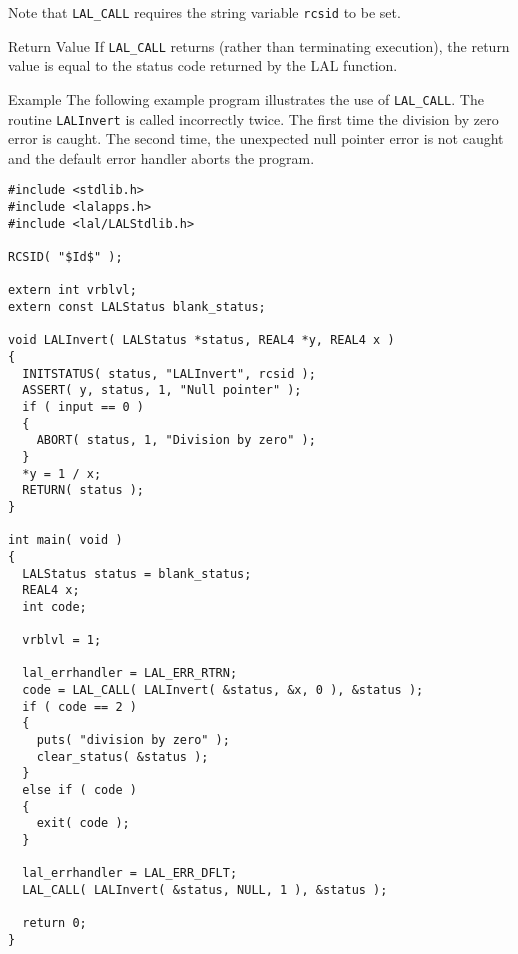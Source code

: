 \documentclass[oneside]{book}
\newenvironment{entry}%
  {\begin{list}{}{\renewcommand{\makelabel}[1]%
    {\parbox[b]{\labelwidth}{\makebox[0pt][l]{\textbf{##1}}\\}}%
    \setlength{\labelwidth}{1em}%
    \setlength{\labelsep}{1em}%
    \setlength{\leftmargin}{2em}%
    \setlength{\topsep}{\medskipamount}%
    \setlength{\itemsep}{\medskipamount}%
    \setlength{\parsep}{\medskipamount}%
    \setlength{\listparindent}{0pt}}}
  {\end{list}}
\newenvironment{indented}%
  {\begin{list}{}{\setlength{\leftmargin}{2em}}%
    \setlength{\itemsep}{\medskipamount}%
    \setlength{\parsep}{\medskipamount}%
    \setlength{\listparindent}{0pt}\item}
  {\end{list}}
\begin{document}
\begin{entry}
Note that \verb$LAL_CALL$ requires the string variable \verb$rcsid$ to be set.

\item[Return Value]
If \verb$LAL_CALL$ returns (rather than terminating execution), the return
value is equal to the status code returned by the LAL function.

\item[Example]
The following example program illustrates the use of \verb$LAL_CALL$.
The routine \verb$LALInvert$ is called incorrectly twice.  The first time
the division by zero error is caught.  The second time, the unexpected null
pointer error is not caught and the default error handler aborts the program.
\begin{indented}
\begin{verbatim}
#include <stdlib.h>
#include <lalapps.h>
#include <lal/LALStdlib.h>

RCSID( "$Id$" );

extern int vrblvl;
extern const LALStatus blank_status;

void LALInvert( LALStatus *status, REAL4 *y, REAL4 x )
{
  INITSTATUS( status, "LALInvert", rcsid );
  ASSERT( y, status, 1, "Null pointer" );
  if ( input == 0 )
  {
    ABORT( status, 1, "Division by zero" );
  }
  *y = 1 / x;
  RETURN( status );
}

int main( void )
{
  LALStatus status = blank_status;
  REAL4 x;
  int code;

  vrblvl = 1;

  lal_errhandler = LAL_ERR_RTRN;
  code = LAL_CALL( LALInvert( &status, &x, 0 ), &status );
  if ( code == 2 )
  {
    puts( "division by zero" );
    clear_status( &status );
  }
  else if ( code )
  {
    exit( code );
  }

  lal_errhandler = LAL_ERR_DFLT;
  LAL_CALL( LALInvert( &status, NULL, 1 ), &status );

  return 0;
}
\end{verbatim}
\end{indented}

\end{entry}

\newpage









\backmatter

\nocite{*}


\printindex
\end{document}
